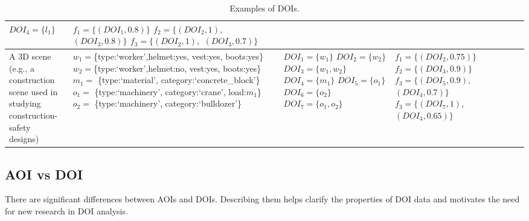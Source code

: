 \begin{table}[htbp]
\begin{tabular}{|l|l|l|l|}
{							$DOI_4 = \{l_1\}$
		}									
		&\shortstack[l]{
							$f_1 = \{(DOI_1,0.8)\}$\\
							$f_2=\{(DOI_2, 1),$\\ $(DOI_3, 0.8)\}$\\
							$f_3=\{(DOI_2, 1), $\\$(DOI_3, 0.7)\}$
							}
		\\\hline
		\shortstack[l]{
							A 3D scene (e.g., a\\construction scene used in\\studying construction-safety\\designs)}
		& \shortstack[l]{
							$w_1=$\{type:`worker',helmet:yes,\\vest:yes, boots:yes\}\\
							$w_2=$\{type:`worker',helmet:no,\\vest:yes, boots:yes\}\\
							$m_1 =$ \{type:`material',\\ category:`concrete\_block'\}\\						
							$o_1 =$ \{type:`machinery', \\category:`crane', load:$m_1$\}\\
							$o_2 =$ \{type:`machinery', \\category:`bulldozer'\}
							}
		& \shortstack[l]{
							$DOI_1 = \{w_1\}$\\
							$DOI_2 = \{w_2\}$\\
							$DOI_3 = \{w_1, w_2\}$\\
							$DOI_4 = \{m_1\}$\\
							$DOI_5 = \{o_1\}$\\
							$DOI_6 = \{o_2\}$\\
							$DOI_7 = \{o_1,o_2\}$
		}									
		&\shortstack[l]{
							$f_1 = \{(DOI_2,0.75)\}$\\
							$f_2 = \{(DOI_3,0.9)\}$\\
							$f_3=\{(DOI_5, 0.9), $\\$(DOI_4, 0.7)\}$\\
							$f_3=\{(DOI_7, 1), $\\$(DOI_4, 0.65)\}$
							}
		\\\hline
		\end{tabular}
		\caption{Examples of DOIs.}
		\label{tab:ExampleDOI}
\end{table} 

\subsection{AOI vs DOI}
\label{sec:AOIvDOI}
There are significant differences between AOIs and DOIs. Describing them helps clarify the properties of DOI data and motivates the need for new research in DOI analysis.

